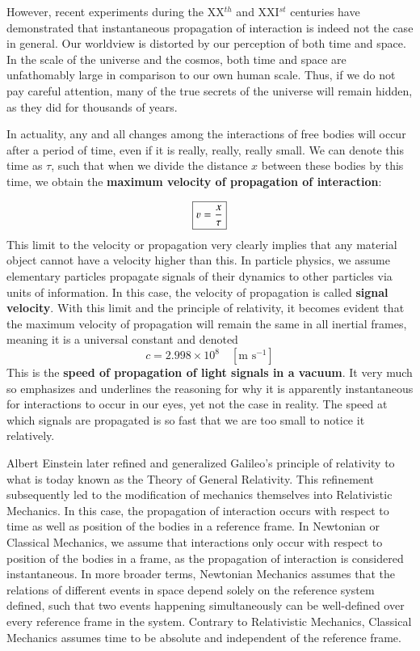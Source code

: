 \documentclass{article}
\begin{document}
			However, recent experiments during the XX$^{th}$ and XXI$^{st}$ centuries have demonstrated that instantaneous propagation of interaction is indeed not the case in general. Our worldview is distorted by our perception of both time and space. In the scale of the universe and the cosmos, both time and space are unfathomably large in comparison to our own human scale. Thus, if we do not pay careful attention, many of the true secrets of the universe will remain hidden, as they did for thousands of years. 
			
			In actuality, any and all changes among the interactions of free bodies will occur after a period of time, even if it is really, really, really small. We can denote this time as $\tau$, such that when we divide the distance $x$ between these bodies by this time, we obtain the \textbf{maximum velocity of propagation of interaction}:
			
			\begin{equation}
				\label{eq:VelocityInteraction}
				\boxed{\varv = \frac{x}{\tau}}
			\end{equation}
			This limit to the velocity or propagation very clearly implies that any material object cannot have a velocity higher than this. In particle physics, we assume elementary particles propagate signals of their dynamics to other particles via units of information. In this case, the velocity of propagation is called \textbf{signal velocity}. With this limit and the principle of relativity, it becomes evident that the maximum velocity of propagation will remain the same in all inertial frames, meaning it is a universal constant and denoted 
			\begin{equation}
				\label{var:LightSpeed}
				\boxed {c = 2.998 \times 10^8 \quad [\text{m } \text{s}^{-1}]}
			\end{equation}
			This is the \textbf{speed of propagation of light signals in a vacuum}. It very much so emphasizes and underlines the reasoning for why it is apparently instantaneous for interactions to occur in our eyes, yet not the case in reality. The speed at which signals are propagated is so fast that we are too small to notice it relatively. 
			
			Albert Einstein later refined and generalized Galileo's principle of relativity to what is today known as the Theory of General Relativity. This refinement subsequently led to the modification of mechanics themselves into Relativistic Mechanics. In this case, the propagation of interaction occurs with respect to time as well as position of the bodies in a reference frame. In Newtonian or Classical Mechanics, we assume that interactions only occur with respect to position of the bodies in a frame, as the propagation of interaction is considered instantaneous. In more broader terms, Newtonian Mechanics assumes that the relations of different events in space depend solely on the reference system defined, such that two events happening simultaneously can be well-defined over every reference frame in the system. Contrary to Relativistic Mechanics, Classical Mechanics assumes time to be absolute and independent of the reference frame.
			
\end{document}

